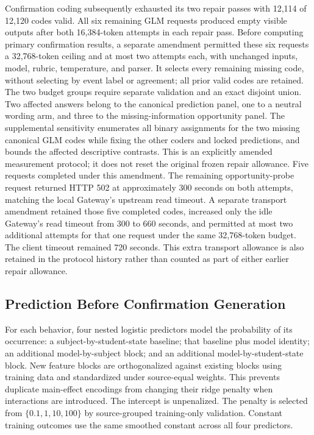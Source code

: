 Confirmation coding subsequently exhausted its two repair passes with 12,114
of 12,120 codes valid. All six remaining GLM requests produced empty visible
outputs after both 16,384-token attempts in each repair pass. Before computing
primary confirmation results, a separate amendment permitted these six requests
a 32,768-token ceiling and at most two attempts each, with unchanged inputs,
model, rubric, temperature, and parser. It selects every remaining missing code,
without selecting by event label or agreement; all prior valid codes are retained.
The two budget groups require separate validation and an exact disjoint union.
Two affected answers belong to the canonical prediction panel, one to a neutral
wording arm, and three to the missing-information opportunity panel. The
supplemental sensitivity enumerates all binary assignments for the two missing
canonical GLM codes while fixing the other coders and locked predictions, and
bounds the affected descriptive contrasts. This is an explicitly amended
measurement protocol; it does not reset the original frozen repair allowance.
Five requests completed under this amendment. The remaining opportunity-probe
request returned HTTP 502 at approximately 300 seconds on both attempts,
matching the local Gateway's upstream read timeout. A separate transport
amendment retained those five completed codes, increased only the idle
Gateway's read timeout from 300 to 660 seconds, and permitted at most two
additional attempts for that one request under the same 32,768-token budget.
The client timeout remained 720 seconds. This extra transport allowance is
also retained in the protocol history rather than counted as part of either
earlier repair allowance.


\subsection{Prediction Before Confirmation Generation}

For each behavior, four nested logistic predictors model the probability of its
occurrence: a subject-by-student-state baseline; that baseline plus model
identity; an additional model-by-subject block; and an additional
model-by-student-state block. New feature blocks are orthogonalized against
existing blocks using training data and standardized under source-equal
weights. This prevents duplicate main-effect encodings from changing their
ridge penalty when interactions are introduced. The intercept is unpenalized.
The penalty is selected from $\{0.1,1,10,100\}$ by source-grouped training-only
validation. Constant training outcomes use the same smoothed constant across
all four predictors.

